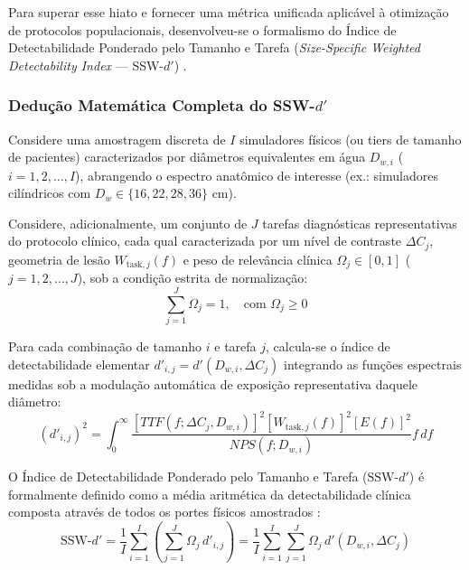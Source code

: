 \documentclass[
  12pt,
  a4paper,
  oneside
]{report}
\begin{document}
Para superar esse hiato e fornecer uma métrica unificada aplicável à otimização de protocolos populacionais, desenvolveu-se o formalismo do Índice de Detectabilidade Ponderado pelo Tamanho e Tarefa (\emph{Size-Specific Weighted Detectability Index} --- SSW-$d'$) \cite{fitton2026, goppel2021}.

\subsubsection{Dedução Matemática Completa do SSW-\texorpdfstring{$d'$}{d'}}
Considere uma amostragem discreta de $I$ simuladores físicos (ou tiers de tamanho de pacientes) caracterizados por diâmetros equivalentes em água $D_{w,i}$ ($i = 1, 2, \dots, I$), abrangendo o espectro anatômico de interesse (ex.: simuladores cilíndricos com $D_w \in \{16, 22, 28, 36\}\text{ cm}$).

Considere, adicionalmente, um conjunto de $J$ tarefas diagnósticas representativas do protocolo clínico, cada qual caracterizada por um nível de contraste $\Delta C_j$, geometria de lesão $W_{\text{task}, j}(f)$ e peso de relevância clínica $\Omega_j \in [0, 1]$ ($j = 1, 2, \dots, J$), sob a condição estrita de normalização:
\begin{equation}
  \sum_{j=1}^J \Omega_j = 1, \quad \text{com } \Omega_j \ge 0
  \label{eq:normalizacao_pesos_clinicos}
\end{equation}

Para cada combinação de tamanho $i$ e tarefa $j$, calcula-se o índice de detectabilidade elementar $d'_{i,j} = d'(D_{w,i}, \Delta C_j)$ integrando as funções espectrais medidas sob a modulação automática de exposição representativa daquele diâmetro:
\begin{equation}
  (d'_{i,j})^2 = \int_0^{\infty} \frac{\left[ TTF(f; \Delta C_j, D_{w,i}) \right]^2 \left[ W_{\text{task}, j}(f) \right]^2 \left[ E(f) \right]^2}{NPS(f; D_{w,i})} f \, df
  \label{eq:dprime_elementar_ij}
\end{equation}

O Índice de Detectabilidade Ponderado pelo Tamanho e Tarefa ($\text{SSW-}d'$) é formalmente definido como a média aritmética da detectabilidade clínica composta através de todos os portes físicos amostrados \cite{fitton2026}:
\begin{equation}
  \text{SSW-}d' = \frac{1}{I} \sum_{i=1}^I \left( \sum_{j=1}^J \Omega_j \, d'_{i,j} \right) = \frac{1}{I} \sum_{i=1}^I \sum_{j=1}^J \Omega_j \, d'(D_{w,i}, \Delta C_j)
  \label{eq:ssw_dprime_discreto}
\end{equation}
\end{document}

